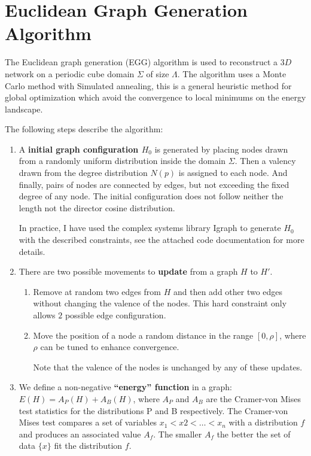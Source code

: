 \section{Euclidean Graph Generation Algorithm}
The Euclidean graph generation (EGG) algorithm is used to reconstruct a $3D$
network on a periodic cube domain $\Sigma$ of size $\Lambda$. The algorithm uses
a Monte Carlo method with Simulated annealing, this is a general heuristic
method for global optimization which avoid the convergence to local minimums on
the energy landscape.

The following steps describe the algorithm:
\begin{enumerate}[label=\textbf{\Roman*}]
  \item A \textbf{initial graph configuration $H_0$} is generated by placing
  nodes drawn from a randomly uniform distribution inside the domain $\Sigma$. Then a
  valency drawn from the degree distribution $N(p)$ is assigned to each node.
  And finally, pairs of nodes are connected by edges, but not exceeding the
  fixed degree of any node. The initial configuration does not follow neither
  the length not the director cosine distribution.
  
  In practice, I have used the complex systems library Igraph to generate $H_0$
  with the described constraints, see the attached code documentation for more
  details.
  \item There are two possible movements to \textbf{update} from a graph $H$ to
  $H'$.
    \begin{enumerate}[label=\textbf{\alph*)}]
    \item Remove at random two edges from $H$ and then add other two edges
    without changing the valence of the nodes. This hard constraint only allows
    $2$ possible edge configuration.
    \item Move the position of a node a random distance in the range $[0,\rho]$,
    where $\rho$ can be tuned to enhance convergence.
    
    Note that the valence of the nodes is unchanged by any of these updates.
  \end{enumerate} 
  
  \item We define a non-negative \textbf{``energy'' function} in a graph:
  $E(H)=A_P(H) + A_B(H)$, where $A_P$ and $A_B$ are the Cramer-von Mises test
  statistics for the distributions P and B respectively. The Cramer-von Mises
  test \citep{anderson_distribution_1962} compares a set of variables $x_1<x2<\ldots<x_n$ with a
  distribution $f$ and produces an associated value $A_f$. The smaller $A_f$ the better the set
  of data $\{x\}$ fit the distribution $f$.
  

\end{enumerate}
